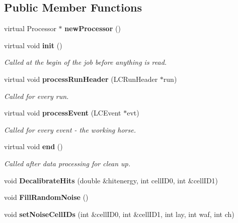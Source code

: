 \subsection*{Public Member Functions}
\begin{DoxyCompactItemize}
\item 
virtual Processor $\ast$ {\bfseries new\-Processor} ()\label{classCALICE_1_1TBEcalDigitisation_ac21322be565c00420729ed4eda6edf06}

\item 
virtual void {\bf init} ()
\begin{DoxyCompactList}\small\item\em Called at the begin of the job before anything is read. \end{DoxyCompactList}\item 
virtual void {\bf process\-Run\-Header} (L\-C\-Run\-Header $\ast$run)\label{classCALICE_1_1TBEcalDigitisation_ab68d8f2ddd5cb8a2167fd2cd7ef820ec}

\begin{DoxyCompactList}\small\item\em Called for every run. \end{DoxyCompactList}\item 
virtual void {\bf process\-Event} (L\-C\-Event $\ast$evt)\label{classCALICE_1_1TBEcalDigitisation_af7e2e52733cec587256fb883a86416ab}

\begin{DoxyCompactList}\small\item\em Called for every event -\/ the working horse. \end{DoxyCompactList}\item 
virtual void {\bf end} ()\label{classCALICE_1_1TBEcalDigitisation_a96a298b34d073351fea166cee60bd366}

\begin{DoxyCompactList}\small\item\em Called after data processing for clean up. \end{DoxyCompactList}\item 
void {\bfseries Decalibrate\-Hits} (double \&hitenergy, int cell\-I\-D0, int \&cell\-I\-D1)\label{classCALICE_1_1TBEcalDigitisation_ad0455f25a8e64078fb21e6bcd4062b2d}

\item 
void {\bfseries Fill\-Random\-Noise} ()\label{classCALICE_1_1TBEcalDigitisation_a76557d9096949f5ccd6ee71c0f23590a}

\item 
void {\bfseries set\-Noise\-Cell\-I\-Ds} (int \&cell\-I\-D0, int \&cell\-I\-D1, int lay, int waf, int ch)\label{classCALICE_1_1TBEcalDigitisation_ab2712d0b84c441c1205c594f9796ded5}

\end{DoxyCompactItemize}
